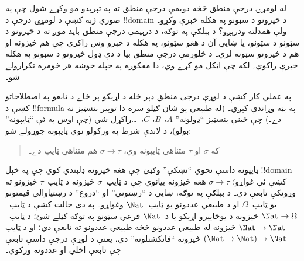 \documentclass[../../../include/open-logic-section]{subfiles}
\begin{document}


له لومړۍ درجې منطق څخه دويمې درجې منطق ته په تېرېدو مو وکړے شول چې
په صوري ژبه کښې د لومړۍ درجې د !!{domain} د څيزونو د سټونو په هکله
خبرې وکړو۔ ولې همدلته ودرېږو؟ د بېلګې په توګه، د درېيمې درجې منطق
بايد موږ ته د څيزونو د سټونو د سټونو، يا ښايي آن د هغو سټونو، په
هکله د خبرو وس راکړي چې هم څيزونه او هم د څيزونو سټونه لري۔ د څلورمې
درجې منطق بيا د دې ډول څيزونو د سټونو په هکله خبرې راکوي۔ لکه چې
اټکل مو کړے وي، دا مفکوره په خپله خوښه هر څومره تکرارولے شو۔

په عملي کار کښې د لوړې درجې منطق ډېر ځله د اړيکو پر ځاے د تابعو په
اصطلاحاتو کښې د !!{formula} په بڼه وړاندې کېږي۔ (له طبيعي يو شان ګڼلو
سره دا توپير بنسټيز نۀ دے۔) چې ځينې بنسټيز ``ډولونه'' $A$، $B$،
$C$،~\dots راکړل شي (چې اوس به ئې ``ټايپونه'' بولو)، د لاندې شرط په
ورکولو نوي ټايپونه جوړولے شو:
\begin{quote}
که $\sigma$ او $\tau$ متناهي ټايپونه وي، $\sigma \to \tau$ هم
متناهي ټايپ دے۔
\end{quote}
ټايپونه داسې نحوي ``نښکې'' وګڼئ چې هغه څيزونه ډلبندي کوي چې په خپل
!!{domain} کښې ئې غواړو؛ $\sigma \to \tau$ هغه څيزونه بيانوي چې د
ټايپ~$\sigma$ څيزونه د ټايپ~$\tau$ څيزونو ته وړونکې تابعې دي۔ د
بېلګې په توګه، ښايي د ``رښتوني'' او ``دروغ'' د رښتياوالي قيمتونو يو
ټايپ~$\Omega$ او د طبيعي عددونو يو ټايپ~$\Nat$ وغواړو۔ په دې حالت
کښې د ټايپ~$\Nat \to \Omega$ څيزونه د يوځاييزو اړيکو يا د~$\Nat$
فرعي سټونو په توګه ګڼلے شئ؛ د ټايپ~$\Nat \to \Nat$ څيزونه له طبيعي
عددونو څخه طبيعي عددونو ته تابعې دي؛ او د ټايپ
$(\Nat \to \Nat) \to \Nat$ څيزونه ``فانکشنلونه'' دي، يعنې د لوړې
درجې داسې تابعې چې تابعې اخلي او عددونه ورکوي۔
\end{document}
